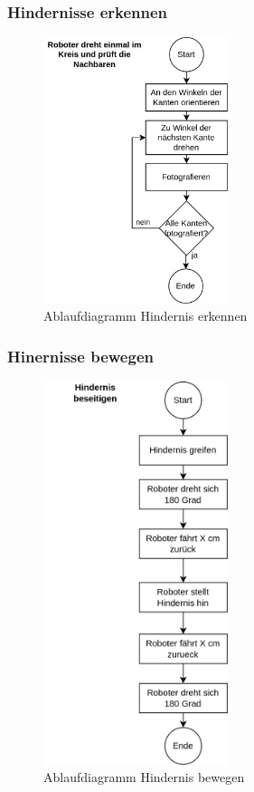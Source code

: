 \subsubsection{Hindernisse erkennen}

\begin{figure}
\centering
\includegraphics[width=0.48\textwidth]{assets/gesamtkonzept/ablaufdiagramm-hindernisse-erkennen.png}
\caption{Ablaufdiagramm Hindernis erkennen}
\label{fig:ablaufdiagramm-hindernis-erkennen}
\end{figure}

\subsubsection{Hinernisse bewegen}

\begin{figure}
\centering
\includegraphics[width=0.48\textwidth]{assets/gesamtkonzept/ablaufdiagramm-hindernis-bewegen.png}
\caption{Ablaufdiagramm Hindernis bewegen}
\label{fig:ablaufdiagramm-hindernis-bewegen}
\end{figure}
